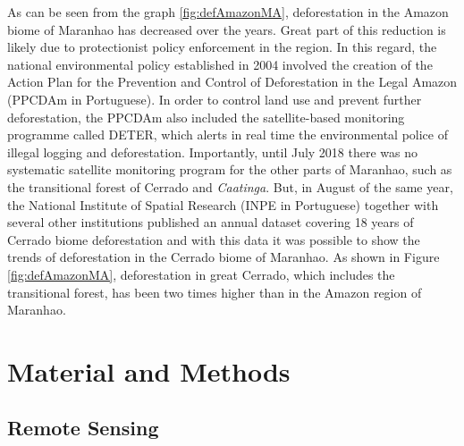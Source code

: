 
As can be seen from the graph \ref{fig:defAmazonMA}, deforestation in the Amazon biome of Maranhao has decreased over the years. Great part of this reduction is likely due to protectionist policy enforcement in the region. In this regard, the national environmental policy established in 2004 involved the creation of the Action Plan for the Prevention and Control of Deforestation in the Legal Amazon (PPCDAm in Portuguese). In order to control land use and prevent further deforestation, the PPCDAm  also included the satellite-based monitoring programme called DETER, which alerts in real time the environmental police of illegal logging and deforestation. Importantly, until July 2018 there was no systematic satellite monitoring program for the other parts of Maranhao, such as the transitional forest of Cerrado and \textit{Caatinga}. But, in August of the same year, the National Institute of Spatial Research (INPE in Portuguese) together with several other institutions published an annual dataset covering 18 years of Cerrado biome deforestation and with this data it was possible to show the trends of deforestation in the Cerrado biome of Maranhao. As shown in Figure \ref{fig:defAmazonMA}, deforestation in great Cerrado, which includes the transitional forest, has been two times higher than in the Amazon region of Maranhao.




\section{Material and Methods}
\label{S:3}
\subsection{Remote Sensing}  %

